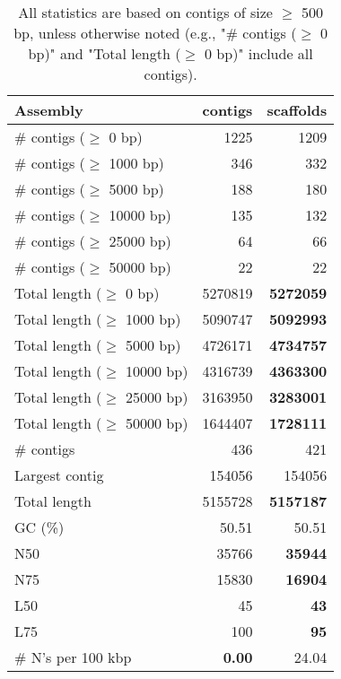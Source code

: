 \documentclass[12pt,a4paper]{article}
\begin{document}
\begin{table}[ht]
\begin{center}
\caption{All statistics are based on contigs of size $\geq$ 500 bp, unless otherwise noted (e.g., "\# contigs ($\geq$ 0 bp)" and "Total length ($\geq$ 0 bp)" include all contigs).}
\begin{tabular}{|l*{2}{|r}|}
\hline
Assembly & contigs & scaffolds \\ \hline
\# contigs ($\geq$ 0 bp) & 1225 & 1209 \\ \hline
\# contigs ($\geq$ 1000 bp) & 346 & 332 \\ \hline
\# contigs ($\geq$ 5000 bp) & 188 & 180 \\ \hline
\# contigs ($\geq$ 10000 bp) & 135 & 132 \\ \hline
\# contigs ($\geq$ 25000 bp) & 64 & 66 \\ \hline
\# contigs ($\geq$ 50000 bp) & 22 & 22 \\ \hline
Total length ($\geq$ 0 bp) & 5270819 & {\bf 5272059} \\ \hline
Total length ($\geq$ 1000 bp) & 5090747 & {\bf 5092993} \\ \hline
Total length ($\geq$ 5000 bp) & 4726171 & {\bf 4734757} \\ \hline
Total length ($\geq$ 10000 bp) & 4316739 & {\bf 4363300} \\ \hline
Total length ($\geq$ 25000 bp) & 3163950 & {\bf 3283001} \\ \hline
Total length ($\geq$ 50000 bp) & 1644407 & {\bf 1728111} \\ \hline
\# contigs & 436 & 421 \\ \hline
Largest contig & 154056 & 154056 \\ \hline
Total length & 5155728 & {\bf 5157187} \\ \hline
GC (\%) & 50.51 & 50.51 \\ \hline
N50 & 35766 & {\bf 35944} \\ \hline
N75 & 15830 & {\bf 16904} \\ \hline
L50 & 45 & {\bf 43} \\ \hline
L75 & 100 & {\bf 95} \\ \hline
\# N's per 100 kbp & {\bf 0.00} & 24.04 \\ \hline
\end{tabular}
\end{center}
\end{table}
\end{document}
